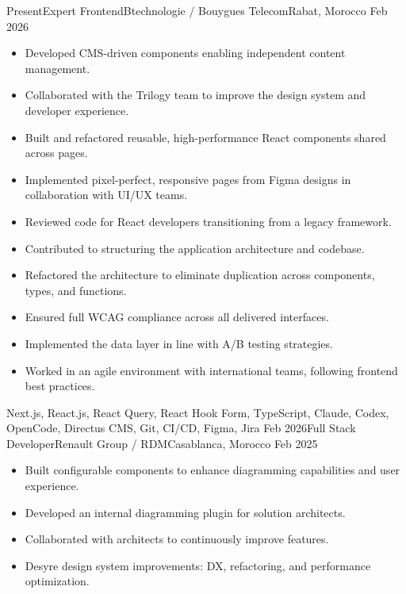 \begin{experiences}
    \experience
        {Present}{Expert Frontend}{Btechnologie / Bouygues Telecom}{Rabat, Morocco}
        {Feb 2026}
            {\begin{itemize}
                \item Developed CMS-driven components enabling independent content management.
                \item Collaborated with the Trilogy team to improve the design system and developer experience.
                \item Built and refactored reusable, high-performance React components shared across pages.
                \item Implemented pixel-perfect, responsive pages from Figma designs in collaboration with UI/UX teams.
                \item Reviewed code for React developers transitioning from a legacy framework.
                \item Contributed to structuring the application architecture and codebase.
                \item Refactored the architecture to eliminate duplication across components, types, and functions.
                \item Ensured full WCAG compliance across all delivered interfaces.
                \item Implemented the data layer in line with A/B testing strategies.
                \item Worked in an agile environment with international teams, following frontend best practices.
            \end{itemize}}
            {Next.js, React.js, React Query, React Hook Form, TypeScript, Claude, Codex, OpenCode, Directus CMS, Git, CI/CD, Figma, Jira}
    \emptySeparator
    \experience
        {Feb 2026}{Full Stack Developer}{Renault Group / RDM}{Casablanca, Morocco}
        {Feb 2025}
            {\begin{itemize}
                \item Built configurable components to enhance diagramming capabilities and user experience.
                \item Developed an internal diagramming plugin for solution architects.
                \item Collaborated with architects to continuously improve features.
                \item Desyre design system improvements: DX, refactoring, and performance optimization.

\end{itemize}}
\end{experiences}

